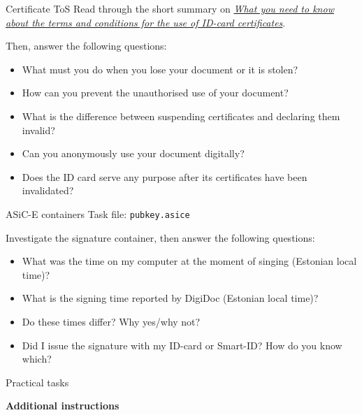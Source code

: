 \documentclass{homework}
\begin{document}
\begin{task}{Certificate ToS}
  Read through the short summary on \href{https://www.id.ee/en/article/compete-information-about-the-terms-of-use-of-certificates/\#what-you-need_2}{\textit{What you need to know about the terms and conditions for the use of ID-card certificates}}.

  Then, answer the following questions:
  \begin{itemize}
    \item What must you do when you lose your document or it is stolen?
    \item How can you prevent the unauthorised use of your document?
    \item What is the difference between suspending certificates and declaring them invalid?
    \item Can you anonymously use your document digitally?
    \item Does the ID card serve any purpose after its certificates have been invalidated?
  \end{itemize}
\end{task}

\begin{task}{ASiC-E containers}
  Task file: \texttt{pubkey.asice}

  Investigate the signature container, then answer the following questions:
  \begin{itemize}
    \item What was the time on my computer at the moment of singing (Estonian local time)?
    \item What is the signing time reported by DigiDoc (Estonian local time)?
    \item Do these times differ? Why yes/why not?
    \item Did I issue the signature with my ID-card or Smart-ID?
    How do you know which?
  \end{itemize}
\end{task}

\newpage
\setcounter{task}{0}

\begin{center}
  Practical tasks
\end{center}

\textbf{Additional instructions}
\end{document}
